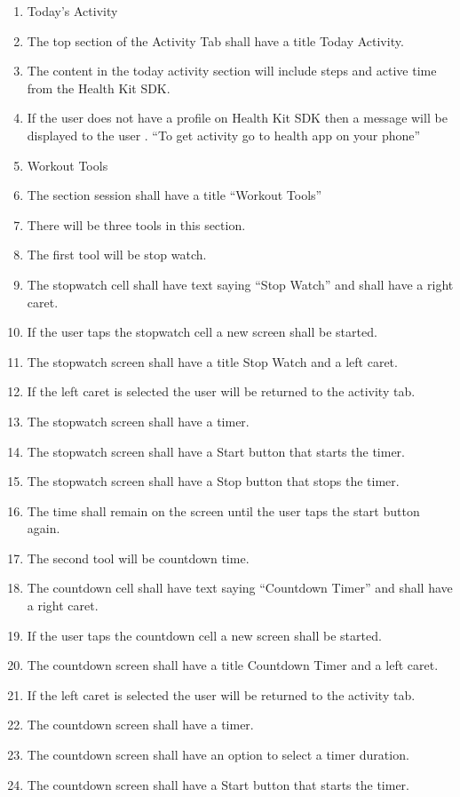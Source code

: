 \documentclass[letterpaper,10pt,titlepage]{article}
\begin{document}
\begin{enumerate}
\item Today’s Activity
\item The top section of the Activity Tab shall have a title Today Activity.
\item The content in the today activity section will include steps and active time from the Health Kit SDK.
\item If the user does not have a profile on Health Kit SDK then a message will be displayed to the user .  “To get activity go to health app on your phone”
\item Workout Tools
\item The section session shall have a title “Workout Tools”
\item There will be three tools in this section.
\item The first tool will be stop watch.
\item The stopwatch cell shall have text saying “Stop Watch” and shall have a right caret.
\item If the user taps the stopwatch cell a new screen shall be started.
\item The stopwatch screen shall have a title Stop Watch and a left caret.
\item If the left caret is selected the user will be returned to the activity tab.
\item The stopwatch screen shall have a timer.
\item The stopwatch screen shall have a Start button that starts the timer.
\item The stopwatch screen shall have a Stop button that stops the timer.
\item The time shall remain on the screen until the user taps the start button again.
\item The second tool will be countdown time.
\item The countdown cell shall have text saying “Countdown Timer” and shall have a right caret.
\item If the user taps the countdown cell a new screen shall be started.
\item The countdown screen shall have a title Countdown Timer and a left caret.
\item If the left caret is selected the user will be returned to the activity tab.
\item The countdown screen shall have a timer.
\item The countdown screen shall have an option to select a timer duration.
\item The countdown screen shall have a Start button that starts the timer.

\end{enumerate}
\end{document}
